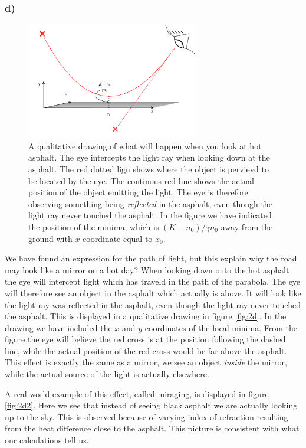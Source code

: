 \documentclass[12pt,twoside]{article}
\begin{document}
\subsubsection*{d)}
\begin{figure}
  \centering
  \includegraphics[width=0.67\textwidth]{../figures/drawing.pdf}
  \caption{A qualitative drawing of what will happen when you look at hot asphalt. The eye intercepts the light ray when looking down at the asphalt. The red dotted lign shows where the object is pervievd to be located by the eye. The continous red line shows the actual position of the object emitting the light. The eye is therefore observing something being \textit{reflected} in the asphalt, even though the light ray never touched the asphalt. In the figure we have indicated the position of the minima, which is $(K-n_0)/\gamma n_0$ away from the ground with $x$-coordinate equal to $x_0$.}
  \label{fig:2d}
\end{figure}
We have found an expression for the path of light, but this explain why the road may look like a mirror on a hot day? When looking down onto the hot asphalt the eye will intercept light which has traveld in the path of the parabola. The eye will therefore see an object in the asphalt which actually is above. It will look like the light ray was reflected in the asphalt, even though the light ray never touched the asphalt. This is displayed in a qualitative drawing in figure \vref{fig:2d}. In the drawing we have included the $x$ and $y$-coordinates of the local minima. From the figure the eye will believe the red cross is at the position following the dashed line, while the actual position of the red cross would be far above the asphalt. This effect is exactly the same as a mirror, we see an object \textit{inside} the mirror, while the actual source of the light is actually elsewhere.\par
A real world example of this effect, called miraging, is displayed in figure \vref{fig:2d2}. Here we see that instead of seeing black asphalt we are actually looking up to the sky. This is observed because of varying index of refraction resulting from the heat difference close to the asphalt. This picture is consistent with what our calculations tell us.
\end{document}
